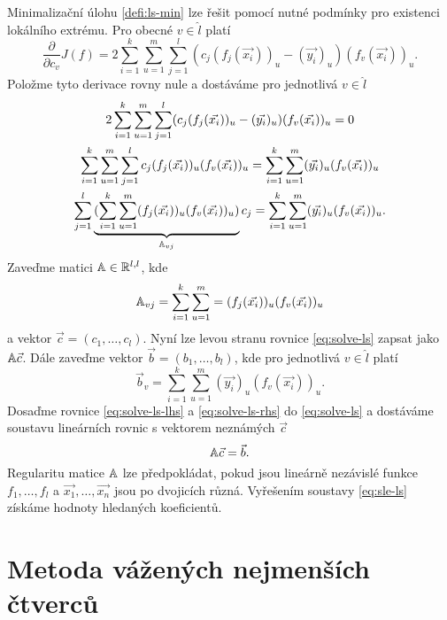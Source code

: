 Minimalizační úlohu \ref{defi:ls-min} lze řešit pomocí nutné podmínky pro existenci lokálního extrému. Pro obecné $v \in \hat l$ platí
\[
  \frac{\partial}{\partial c_v}J(f) = 2\sum_{i=1}^k\sum_{u=1}^m\sum_{j=1}^l(c_j(f_j(\vec{x_i}))_u - (\vec{y_i})_u)(f_v(\vec{x_i}))_u.
\]
Položme tyto derivace rovny nule a dostáváme pro jednotlivá $v \in \hat l$
\begin{multline}
\label{eq:solve-ls}
  2\sum_{i=1}^k\sum_{u=1}^m\sum_{j=1}^l (c_j(f_j(\vec{x_i}))_u - (\vec{y_i})_u)(f_v(\vec{x_i}))_u = 0\\
  \sum_{i=1}^k\sum_{u=1}^m\sum_{j=1}^l c_j(f_j(\vec{x_i}))_u (f_v(\vec{x_i}))_u = \sum_{i=1}^k\sum_{u=1}^m(\vec{y_i})_u(f_v(\vec{x_i}))_u\\
  \sum_{j=1}^l\underbrace{(\sum_{i=1}^k\sum_{u=1}^m(f_j(\vec{x_i}))_u (f_v(\vec{x_i}))_u)}_{\mathbb{A}_{vj}}c_j = \sum_{i=1}^k\sum_{u=1}^m(\vec{y_i})_u(f_v(\vec{x_i}))_u.\\
\end{multline}
Zaveďme matici $\mathbb{A} \in \mathbb{R}^{l,l}$, kde 
\begin{equation}
\label{eq:solve-ls-lhs}
  \mathbb{A}_{vj} = \sum_{i=1}^k\sum_{u=1}^m = (f_j(\vec{x_i}))_u(f_v(\vec{x_i}))_u
\end{equation}
a vektor $\vec{c} = (c_1,\ldots,c_l)$. Nyní lze levou stranu rovnice \ref{eq:solve-ls} zapsat jako $\mathbb{A}\vec{c}$. Dále zaveďme vektor $\vec{b} = (b_1,\ldots,b_l)$, kde pro jednotlivá $v \in \hat l$ platí
\begin{equation}
\label{eq:solve-ls-rhs}
  \vec{b}_v = \sum_{i=1}^k\sum_{u=1}^m (\vec{y_i})_u (f_v(\vec{x_i}))_u.
\end{equation}
Dosaďme rovnice \ref{eq:solve-ls-lhs} a \ref{eq:solve-ls-rhs} do \ref{eq:solve-ls} a dostáváme soustavu lineárních rovnic s vektorem neznámých $\vec{c}$
\begin{equation}
  \label{eq:sle-ls}
  \mathbb{A}\vec{c} = \vec{b}.
\end{equation}
Regularitu matice $\mathbb{A}$ lze předpokládat, pokud jsou lineárně nezávislé funkce $f_1, \ldots, f_l$ a $\vec{x_1}, \ldots, \vec{x_n}$ jsou po dvojicích různá. Vyřešením soustavy \ref{eq:sle-ls} získáme hodnoty hledaných koeficientů.

\section{Metoda vážených nejmenších čtverců}

